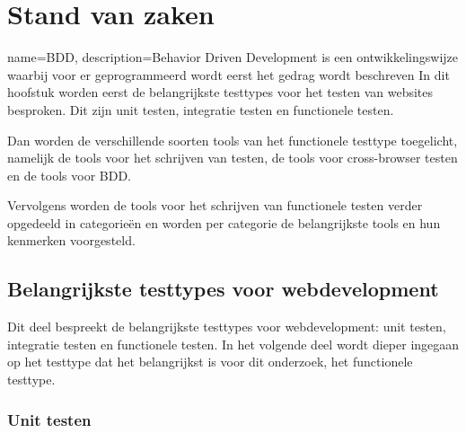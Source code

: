 \chapter{Stand van zaken}
\label{ch:stand-van-zaken}
{
    name={BDD},
    description={Behavior Driven Development is een ontwikkelingswijze waarbij voor er geprogrammeerd wordt eerst het gedrag wordt beschreven}
}
In dit hoofstuk worden eerst de belangrijkste testtypes voor het testen van websites besproken. Dit zijn unit testen, integratie testen en functionele testen. 

Dan worden de verschillende soorten \glspl{tool} van het functionele testtype toegelicht, namelijk de \glspl{tool} voor het schrijven van testen, de \glspl{tool} voor cross-browser testen en de \glspl{tool} voor \gls{BDD}.

Vervolgens worden de \glspl{tool} voor het schrijven van functionele testen verder opgedeeld in categorieën en worden per categorie de belangrijkste \glspl{tool} en hun kenmerken voorgesteld.

\clearpage
\section{Belangrijkste testtypes voor webdevelopment}

Dit deel bespreekt de belangrijkste testtypes voor webdevelopment: unit testen, integratie testen en functionele testen. In het volgende deel wordt dieper ingegaan op het testtype dat het belangrijkst is voor dit onderzoek, het functionele testtype.

\subsection{Unit testen}

